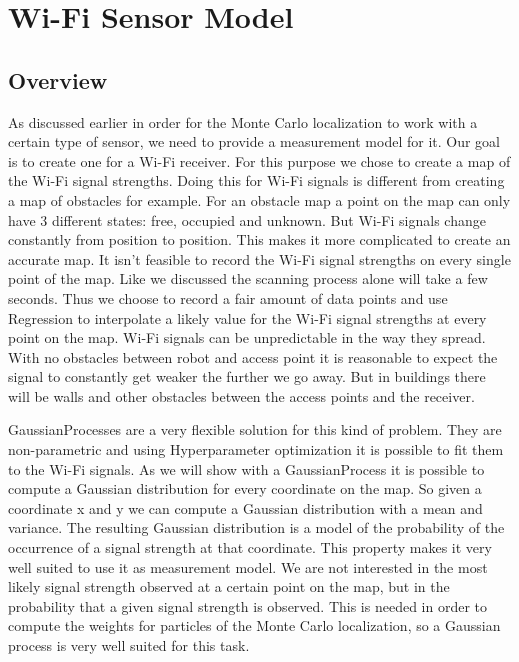 \section{Wi-Fi Sensor Model} \label{sec:gp}
\subsection{Overview}
As discussed earlier in order for the Monte Carlo localization to work with a certain type of sensor, we need to provide a measurement model for it. Our goal is to create one for a Wi-Fi receiver. For this purpose we chose to create a map of the Wi-Fi signal strengths. Doing this for Wi-Fi signals is different from creating a map of obstacles for example. For an obstacle map a point on the map can only have 3 different states: free, occupied and unknown. But Wi-Fi signals change constantly from position to position. This makes it more complicated to create an accurate map. It isn't feasible to record the Wi-Fi signal strengths on every single point of the map. Like we discussed the scanning process alone will take a few seconds. Thus we choose to record a fair amount of data points and use \gls{Regression} to interpolate a likely value for the Wi-Fi signal strengths at every point on the map. Wi-Fi signals can be unpredictable in the way they spread. With no obstacles between robot and access point it is reasonable to expect the signal to constantly get weaker the further we go away. But in buildings there will be walls and other obstacles between the access points and the receiver. 

\Gls{GaussianProcess}es are a very flexible solution for this kind of problem. They are non-parametric and using \gls{Hyperparameter} optimization it is possible to fit them to the Wi-Fi signals. As we will show with a \Gls{GaussianProcess} it is possible to compute a Gaussian distribution for every coordinate on the map. So given a coordinate x and y we can compute a Gaussian distribution with a mean and variance. The resulting Gaussian distribution is a model of the probability of the occurrence of a signal strength at that coordinate. This property makes it very well suited to use it as measurement model. We are not interested in the most likely signal strength observed at a certain point on the map, but in the probability that a given signal strength is observed. This is needed in order to compute the weights for particles of the Monte Carlo localization, so a Gaussian process is very well suited for this task.

